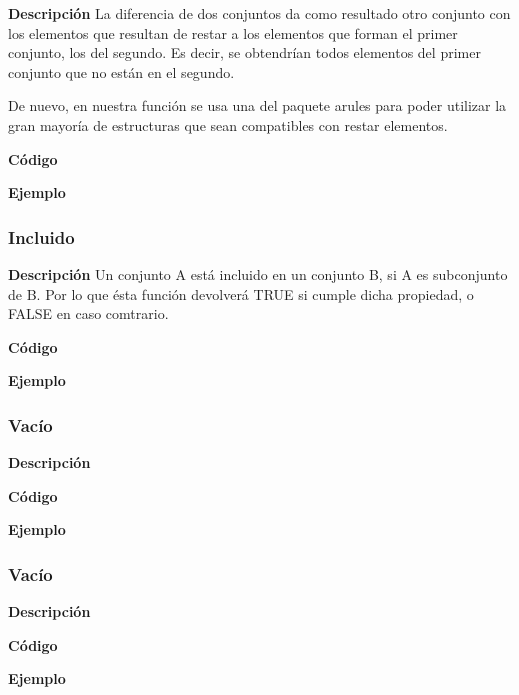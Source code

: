     \textbf{Descripci\'on}
    La diferencia de dos conjuntos da como resultado otro conjunto con los elementos que resultan de 
    restar a los elementos que forman el primer conjunto, los del segundo. Es decir, se obtendr\'ian 
    todos elementos del  primer conjunto que no est\'an en el segundo.

    De nuevo, en nuestra funci\'on se usa una del paquete arules para poder utilizar la gran mayor\'ia de estructuras 
    que sean compatibles con restar elementos.
    

    \textbf{C\'odigo}

    
    \textbf{Ejemplo}


\subsubsection{Incluido}

    \textbf{Descripci\'on}
    Un conjunto A est\'a incluido en un conjunto B, si A es subconjunto de B. Por lo que \'esta funci\'on 
    devolver\'a TRUE si cumple dicha propiedad, o FALSE en caso comtrario.

    \textbf{C\'odigo}


    \textbf{Ejemplo}


\subsubsection{Vac\'io}

    \textbf{Descripci\'on}


    \textbf{C\'odigo}


    \textbf{Ejemplo}


\subsubsection{Vac\'io}

    \textbf{Descripci\'on}


    \textbf{C\'odigo}


    \textbf{Ejemplo}